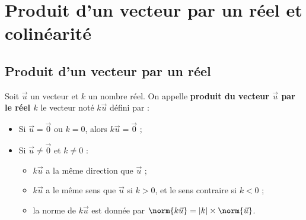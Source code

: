 \section{Produit d'un vecteur par un réel et colinéarité}

\subsection{Produit d'un vecteur par un réel}

\begin{definition}
	Soit $\vec{u}$ un vecteur et $k$ un nombre réel. On appelle \textbf{produit du vecteur $\vec{u}$ par le réel $k$} le vecteur noté $k\vec{u}$ défini par :
	\begin{itemize}
		\item Si $\vec{u} = \vec{0}$ ou $k = 0$, alors $k\vec{u} = \vec{0}$ ;
		\item Si $\vec{u} \neq \vec{0}$ et $k \neq 0$ :
			\begin{itemize}
				\item $k\vec{u}$ a la même direction que $\vec{u}$ ;
				\item $k\vec{u}$ a le même sens que $\vec{u}$ si $k > 0$, et le sens contraire si $k < 0$ ;
				\item la norme de $k\vec{u}$ est donnée par $\norm{k\vec{u}} = |k| \times \norm{\vec{u}}$.
			\end{itemize}
	\end{itemize}
\end{definition}

